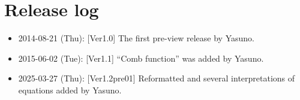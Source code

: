 \documentclass[a4paper]{article}
\begin{document}
\section*{Release log}
\begin{itemize}
\item 2014-08-21 (Thu): [Ver1.0] The first pre-view release by Yasuno.
\item 2015-06-02 (Tue): [Ver1.1] ``Comb function'' was added by Yasuno.
\item 2025-03-27 (Thu): [Ver1.2pre01] Reformatted and several interpretations of equations added by Yasuno.
\end{itemize}
\end{document}
